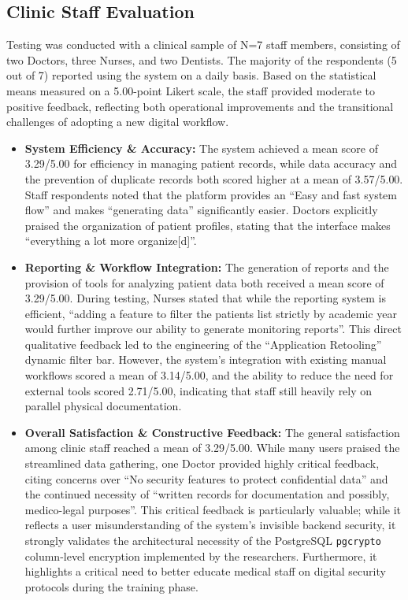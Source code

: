 \subsection{Clinic Staff Evaluation}
Testing was conducted with a clinical sample of N=7 staff members, consisting of two Doctors, three Nurses, and two Dentists. The majority of the respondents (5 out of 7) reported using the system on a daily basis. Based on the statistical means measured on a 5.00-point Likert scale, the staff provided moderate to positive feedback, reflecting both operational improvements and the transitional challenges of adopting a new digital workflow.

\begin{itemize}
    \item \textbf{System Efficiency \& Accuracy:} The system achieved a mean score of 3.29/5.00 for efficiency in managing patient records, while data accuracy and the prevention of duplicate records both scored higher at a mean of 3.57/5.00. Staff respondents noted that the platform provides an ``Easy and fast system flow'' and makes ``generating data'' significantly easier. Doctors explicitly praised the organization of patient profiles, stating that the interface makes ``everything a lot more organize[d]''.
    \item \textbf{Reporting \& Workflow Integration:} The generation of reports and the provision of tools for analyzing patient data both received a mean score of 3.29/5.00. During testing, Nurses stated that while the reporting system is efficient, ``adding a feature to filter the patients list strictly by academic year would further improve our ability to generate monitoring reports''. This direct qualitative feedback led to the engineering of the ``Application Retooling'' dynamic filter bar. However, the system's integration with existing manual workflows scored a mean of 3.14/5.00, and the ability to reduce the need for external tools scored 2.71/5.00, indicating that staff still heavily rely on parallel physical documentation.
    \item \textbf{Overall Satisfaction \& Constructive Feedback:} The general satisfaction among clinic staff reached a mean of 3.29/5.00. While many users praised the streamlined data gathering, one Doctor provided highly critical feedback, citing concerns over ``No security features to protect confidential data'' and the continued necessity of ``written records for documentation and possibly, medico-legal purposes''. This critical feedback is particularly valuable; while it reflects a user misunderstanding of the system's invisible backend security, it strongly validates the architectural necessity of the PostgreSQL \texttt{pgcrypto} column-level encryption implemented by the researchers. Furthermore, it highlights a critical need to better educate medical staff on digital security protocols during the training phase.
\end{itemize}


